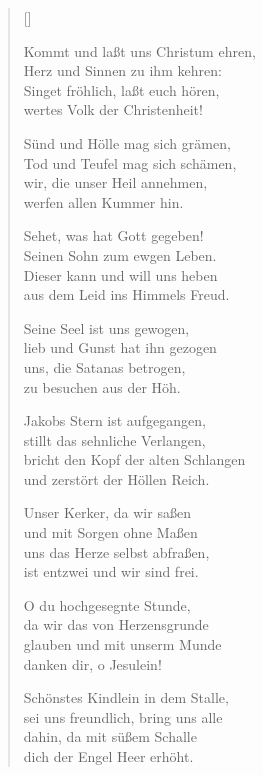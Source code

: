 \begin{multicols}{2}
\settowidth{\versewidth}{Kommt und laßt uns Christum ehren,}
\begin{verse}[\versewidth]
 
 Kommt und laßt uns Christum ehren,\\
Herz und Sinnen zu ihm kehren:\\
Singet fröhlich, laßt euch hören,\\
wertes Volk der Christenheit!
 
 Sünd und Hölle mag sich grämen,\\
Tod und Teufel mag sich schämen,\\
wir, die unser Heil annehmen,\\
werfen allen Kummer hin.
 
 Sehet, was hat Gott gegeben!\\
Seinen Sohn zum ewgen Leben.\\
Dieser kann und will uns heben\\
aus dem Leid ins Himmels Freud.
 
 Seine Seel ist uns gewogen,\\
lieb und Gunst hat ihn gezogen\\
uns, die Satanas betrogen,\\
zu besuchen aus der Höh.
 
 Jakobs Stern ist aufgegangen,\\
stillt das sehnliche Verlangen,\\
bricht den Kopf der alten Schlangen\\
und zerstört der Höllen Reich.
 
 Unser Kerker, da wir saßen\\
und mit Sorgen ohne Maßen\\
uns das Herze selbst abfraßen,\\
ist entzwei und wir sind frei.
 
 O du hochgesegnte Stunde,\\
da wir das von Herzensgrunde\\
glauben und mit unserm Munde\\
danken dir, o Jesulein!
 
 Schönstes Kindlein in dem Stalle,\\
sei uns freundlich, bring uns alle\\
dahin, da mit süßem Schalle\\
dich der Engel Heer erhöht.

\end{verse}
\end{multicols}
